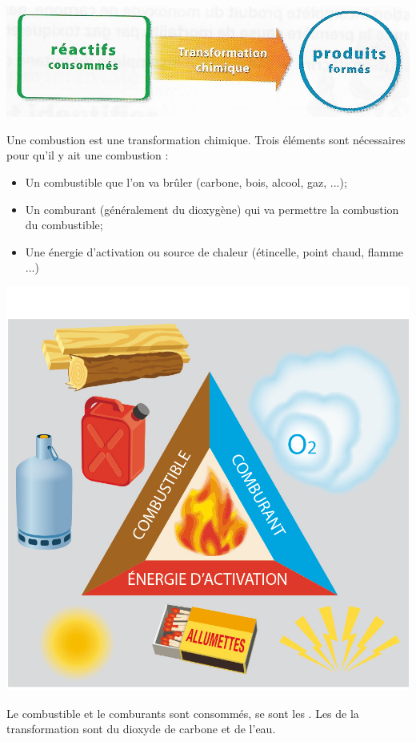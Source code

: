 \documentclass[12pt,a4paper]{article}
\begin{document}
	
\begin{center}
	\includegraphics[scale=0.4]{img/transfo}
\end{center}




\begin{myex}
	Une combustion est une transformation chimique.
	Trois éléments sont nécessaires pour qu'il y ait une combustion :
	\begin{multicols}{2}
		\begin{itemize}
			\item Un combustible que l'on va brûler (carbone, bois, alcool, gaz, ...);
			\item Un comburant (généralement du dioxygène) qui va permettre la combustion du combustible;
			\item Une énergie d'activation ou source de chaleur (étincelle, point chaud, flamme ...)
		\end{itemize}
		
		\begin{center}
			\includegraphics[scale=0.15]{img/triangle}
		\end{center}
	\end{multicols}
	
	Le combustible et le comburants sont consommés, se sont les . 
	Les  de la transformation sont du dioxyde de carbone et de l'eau.
	
	
\end{myex}
\end{document}
